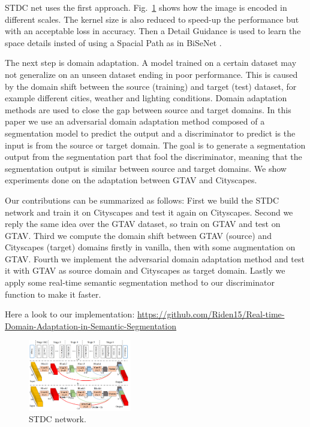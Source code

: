\documentclass[conference]{IEEEtran}
\begin{document}
STDC net \cite{b1} uses the first approach. Fig.~\ref{fig:stdc_net} shows how the image is encoded in different scales. The kernel size is also reduced
to speed-up the performance but with an acceptable loss in accuracy. Then a Detail Guidance is used to learn the space details insted of 
using a Spacial Path as in BiSeNet \cite{b2}.

The next step is domain adaptation. A model trained on a certain dataset may not generalize on an unseen dataset ending in poor performance.
This is caused by the domain shift between the source (training) and target (test) dataset, for example different cities, weather and
lighting conditions. Domain adaptation methods are used to close the gap between source and target domains. In this paper we use an 
adversarial domain adaptation method \cite{b3} composed of a segmentation model to predict the output and a discriminator to
predict is the input is from the source or target domain. The goal is to generate a segmentation output from the segmentation part that 
fool the discriminator, meaning that the segmentation output is similar between source and target domains. We show experiments done on 
the adaptation between GTAV and Cityscapes.

Our contributions can be summarized as follows:
First we build the STDC network and train it on Cityscapes and test it again on Cityscapes. Second we reply the same idea over the 
GTAV dataset, so train on GTAV and test on GTAV. Third we compute the domain shift between GTAV (source) and Cityscapes (target) domains
firstly in vanilla, then with some augmentation on GTAV. Fourth we implement the adversarial domain adaptation method and test it 
with GTAV as source domain and Cityscapes as target domain. Lastly we apply some real-time semantic segmentation method to our 
discriminator function to make it faster.

Here a look to our implementation: \url{https://github.com/Riden15/Real-time-Domain-Adaptation-in-Semantic-Segmentation}

\begin{figure}[tp]
\centerline{\includegraphics[width=0.4\textwidth]{figures/Figure1-STDCnet}}
\caption{STDC network.}
\label{fig:stdc_net}
\end{figure}
\end{document}
